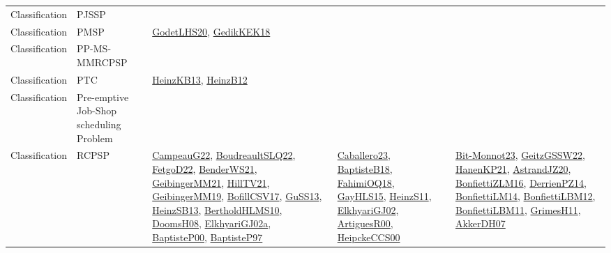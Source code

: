 {\begin{longtable}{lp{3cm}>{\raggedright}p{6cm}>{\raggedright}p{6cm}p{8cm}}
Classification & PJSSP &  &  & \\
Classification & PMSP & \href{papers/GodetLHS20.pdf}{GodetLHS20}\cite{GodetLHS20}, \href{articles/GedikKEK18.pdf}{GedikKEK18}\cite{GedikKEK18} &  & \\
Classification & PP-MS-MMRCPSP &  &  & \\
Classification & PTC & \href{papers/HeinzKB13.pdf}{HeinzKB13}\cite{HeinzKB13}, \href{papers/HeinzB12.pdf}{HeinzB12}\cite{HeinzB12} &  & \\
Classification & Pre-emptive Job-Shop scheduling Problem &  &  & \\
Classification & RCPSP & \href{articles/CampeauG22.pdf}{CampeauG22}\cite{CampeauG22}, \href{papers/BoudreaultSLQ22.pdf}{BoudreaultSLQ22}\cite{BoudreaultSLQ22}, \href{articles/FetgoD22.pdf}{FetgoD22}\cite{FetgoD22}, \href{papers/BenderWS21.pdf}{BenderWS21}\cite{BenderWS21}, \href{papers/GeibingerMM21.pdf}{GeibingerMM21}\cite{GeibingerMM21}, \href{papers/HillTV21.pdf}{HillTV21}\cite{HillTV21}, \href{papers/GeibingerMM19.pdf}{GeibingerMM19}\cite{GeibingerMM19}, \href{papers/BofillCSV17.pdf}{BofillCSV17}\cite{BofillCSV17}, \href{papers/GuSS13.pdf}{GuSS13}\cite{GuSS13}, \href{articles/HeinzSB13.pdf}{HeinzSB13}\cite{HeinzSB13}, \href{papers/BertholdHLMS10.pdf}{BertholdHLMS10}\cite{BertholdHLMS10}, \href{papers/DoomsH08.pdf}{DoomsH08}\cite{DoomsH08}, \href{papers/ElkhyariGJ02a.pdf}{ElkhyariGJ02a}\cite{ElkhyariGJ02a}, \href{articles/BaptisteP00.pdf}{BaptisteP00}\cite{BaptisteP00}, \href{papers/BaptisteP97.pdf}{BaptisteP97}\cite{BaptisteP97} & \href{articles/Caballero23.pdf}{Caballero23}\cite{Caballero23}, \href{articles/BaptisteB18.pdf}{BaptisteB18}\cite{BaptisteB18}, \href{articles/FahimiOQ18.pdf}{FahimiOQ18}\cite{FahimiOQ18}, \href{papers/GayHLS15.pdf}{GayHLS15}\cite{GayHLS15}, \href{papers/HeinzS11.pdf}{HeinzS11}\cite{HeinzS11}, \href{papers/ElkhyariGJ02.pdf}{ElkhyariGJ02}\cite{ElkhyariGJ02}, \href{articles/ArtiguesR00.pdf}{ArtiguesR00}\cite{ArtiguesR00}, \href{articles/HeipckeCCS00.pdf}{HeipckeCCS00}\cite{HeipckeCCS00} & \href{papers/Bit-Monnot23.pdf}{Bit-Monnot23}\cite{Bit-Monnot23}, \href{papers/GeitzGSSW22.pdf}{GeitzGSSW22}\cite{GeitzGSSW22}, \href{papers/HanenKP21.pdf}{HanenKP21}\cite{HanenKP21}, \href{articles/AstrandJZ20.pdf}{AstrandJZ20}\cite{AstrandJZ20}, \href{papers/BonfiettiZLM16.pdf}{BonfiettiZLM16}\cite{BonfiettiZLM16}, \href{papers/DerrienPZ14.pdf}{DerrienPZ14}\cite{DerrienPZ14}, \href{papers/BonfiettiLM14.pdf}{BonfiettiLM14}\cite{BonfiettiLM14}, \href{papers/BonfiettiLBM12.pdf}{BonfiettiLBM12}\cite{BonfiettiLBM12}, \href{papers/BonfiettiLBM11.pdf}{BonfiettiLBM11}\cite{BonfiettiLBM11}, \href{papers/GrimesH11.pdf}{GrimesH11}\cite{GrimesH11}, \href{papers/AkkerDH07.pdf}{AkkerDH07}\cite{AkkerDH07}\\

\end{longtable}}

